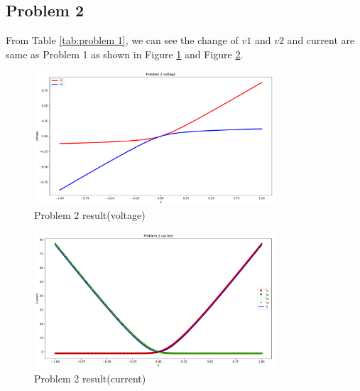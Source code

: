 \documentclass{article}
\begin{document}
\subsection{Problem 2}
From Table \ref{tab:problem 1}, we can see the change of $v1$ and $v2$ and current are same as Problem 1 as shown in Figure \ref{fig:M2 volt}
and Figure \ref{fig:M2 current}.
\begin{figure}[H]
    \centering
    \includegraphics[width=0.8\textwidth]{src/M2_voltage.pdf}
    \caption{Problem 2 result(voltage)}
    \label{fig:M2 volt}
\end{figure}
\begin{figure}[H]
    \centering
    \includegraphics[width=0.8\textwidth]{src/M2_current.pdf}
    \caption{Problem 2 result(current)}
    \label{fig:M2 current}
\end{figure}
\end{document}
